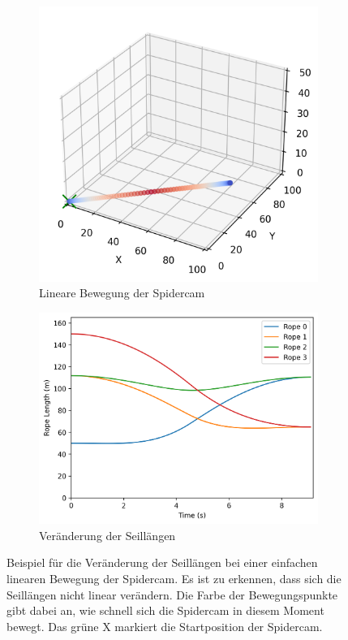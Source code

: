 \begin{figure}[H]
    \centering
    \begin{subfigure}[b]{0.45\textwidth}
        \centering
        \includegraphics[width=\textwidth]{../python/output/test_single_cam_pos.png}
        \caption{Lineare Bewegung der Spidercam}
        \label{fig:length_change}
    \end{subfigure}
    \hfill
    \begin{subfigure}[b]{0.45\textwidth}
        \centering
        \includegraphics[width=\textwidth]{../python/output/test_single_rope_lengths.png}
        \caption{Veränderung der Seillängen}
        \label{fig:length_change_2}
    \end{subfigure}
    \caption{Beispiel für die Veränderung der Seillängen bei einer einfachen linearen Bewegung der Spidercam.
        Es ist zu erkennen, dass sich die Seillängen nicht linear verändern.
        Die Farbe der Bewegungspunkte gibt dabei an, wie schnell sich die Spidercam in diesem Moment bewegt.
        Das grüne X markiert die Startposition der Spidercam.}
    \label{fig:length_change}
\end{figure}

